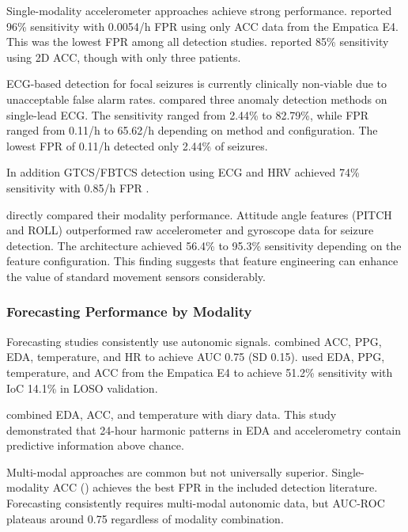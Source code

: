 Single-modality accelerometer approaches achieve strong performance. \textcite{spahrDeepLearningbasedDetection2025} reported 96\% sensitivity with 0.0054/h FPR using only ACC data from the Empatica E4. 
This was the lowest FPR among all detection studies. \textcite{borujenyDetectionEpilepticSeizure2013} reported 85\% sensitivity using 2D ACC, though with only three patients.

ECG-based detection for focal seizures is currently clinically non-viable due to unacceptable false alarm rates. \textcite{reintjesECGBasedDetectionEpileptic2025} compared three anomaly detection methods on single-lead ECG. The sensitivity ranged from 2.44\% to 82.79\%, while FPR ranged from 0.11/h to 65.62/h depending on method and configuration. The lowest FPR of 0.11/h detected only 2.44\% of seizures. 

In addition GTCS/FBTCS detection using ECG and HRV achieved 74\% sensitivity with 0.85/h FPR  \parencite{odeDevelopmentEpilepticSeizure2023}.

\textcite{wangEpilepticSeizureDetection2025} directly compared their modality performance. Attitude angle features (PITCH and ROLL) outperformed raw accelerometer and gyroscope data for seizure detection. The architecture achieved 56.4\% to 95.3\% sensitivity depending on the feature configuration. This finding suggests that feature engineering can enhance the value of standard movement sensors considerably.

\subsubsection{Forecasting Performance by Modality}

Forecasting studies consistently use autonomic signals. \textcite{nasseriAmbulatorySeizureForecasting2021} combined ACC, PPG, EDA, temperature, and HR to achieve AUC 0.75 (SD 0.15). \textcite{meiselMachineLearningWristband2020} used EDA, PPG, temperature, and ACC from the Empatica E4 to achieve 51.2\% sensitivity with IoC 14.1\% in LOSO validation.

\textcite{vielufSeizureMonitoringCombined2025} combined EDA, ACC, and temperature with diary data. This study demonstrated that 24-hour harmonic patterns in EDA and accelerometry contain predictive information above chance.

Multi-modal approaches are common but not universally superior. Single-modality ACC (\textcite{spahrDeepLearningbasedDetection2025}) achieves the best FPR in the included detection literature. Forecasting consistently requires multi-modal autonomic data, but AUC-ROC plateaus around 0.75 regardless of modality combination.
